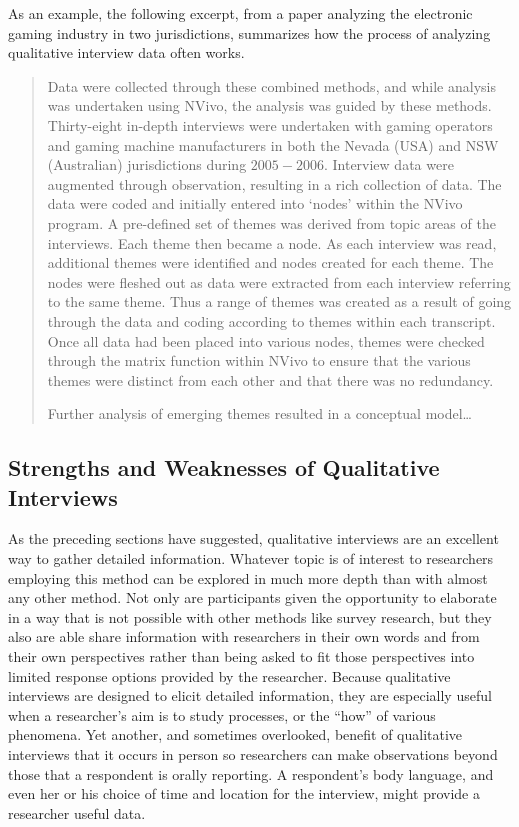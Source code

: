 As an example, the following excerpt, from a paper analyzing the electronic gaming industry in two jurisdictions, \cite{buchanan2010efficacy} summarizes how the process of analyzing qualitative interview data often works.

\begin{quote}
	Data were collected through these combined methods, and while analysis was undertaken using NVivo, the analysis was guided by these methods. Thirty-eight in-depth interviews were undertaken with gaming operators and gaming machine manufacturers in both the Nevada (USA) and NSW (Australian) jurisdictions during $ 2005-2006 $. Interview data were augmented through observation, resulting in a rich collection of data. The data were coded and initially entered into ‘nodes’ within the NVivo program. A pre-defined set of themes was derived from topic areas of the interviews. Each theme then became a node. As each interview was read, additional themes were identified and nodes created for each theme. The nodes were fleshed out as data were extracted from each interview referring to the same theme. Thus a range of themes was created as a result of going through the data and coding according to themes within each transcript. Once all data had been placed into various nodes, themes were checked through the matrix function within NVivo to ensure that the various themes were distinct from each other and that there was no redundancy. 
	
	Further analysis of emerging themes resulted in a conceptual model\ldots
\end{quote}

\subsection{Strengths and Weaknesses of Qualitative Interviews}

As the preceding sections have suggested, qualitative interviews are an excellent way to gather detailed information. Whatever topic is of interest to researchers employing this method can be explored in much more depth than with almost any other method. Not only are participants given the opportunity to elaborate in a way that is not possible with other methods like survey research, but they also are able share information with researchers in their own words and from their own perspectives rather than being asked to fit those perspectives into limited response options provided by the researcher. Because qualitative interviews are designed to elicit detailed information, they are especially useful when a researcher's aim is to study processes, or the ``how'' of various phenomena. Yet another, and sometimes overlooked, benefit of qualitative interviews that it occurs in person so researchers can make observations beyond those that a respondent is orally reporting. A respondent's body language, and even her or his choice of time and location for the interview, might provide a researcher useful data.

